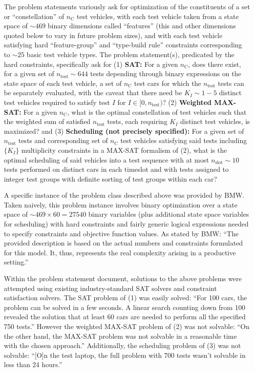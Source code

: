 \documentclass[aps,prl,twocolumn,superscriptaddress,groupedaddress]{revtex4}  %
\begin{document}
The problem statements variously ask for optimization of the constituents of a
set or
``constellation'' of $n_{\mathrm{C}}$ test vehicles, with each test vehicle taken
from a state space of $\sim 469$ binary dimensions called ``features'' (this and other dimensions
quoted below to vary
in future problem sizes), and with each test vehicle 
satisfying hard ``feature-group'' and ``type-build rule'' constraints
corresponding to $\sim 25$ basic test vehicle types. The problem
statement(s), predicated by the hard constraints, specifically ask for
(1) \textbf{SAT:} 
For a given $n_{\mathrm{C}}$, does there exist, for a given set of
$n_{\mathrm{test}} \sim 644$ tests depending through binary expressions on the state
space of each test vehicle, a set of $n_{\mathrm{C}}$ test cars for which the
$n_{\mathrm{test}}$ tests can be separately evaluated, with the caveat 
that there need be $K_I \sim 1-5$ distinct
test vehicles required to satisfy test $I$ for $I \in [0, n_{\mathrm{test}})$?
(2) \textbf{Weighted MAX-SAT:} For a given $n_{\mathrm{C}}$, what is the optimal
constellation of test vehicles such that the weighted sum of satisfied $n_{\mathrm{test}}$
tests, each requiring $K_I$ distinct test vehicles, is maximized? and 
(3) \textbf{Scheduling (not precisely specified):} For a given set of
$n_{\mathrm{test}}$ tests and corresponding set of $n_{\mathrm{C}}$ test
vehicles satisfying said tests including $\{ K_I \}$ multiplicity constraints in
a MAX-SAT formalism of (2), what is the optimal scheduling of said vehicles into 
a test sequence with at most $n_{\mathrm{slot}} \sim 10$ tests performed on
distinct cars in each timeslot and with tests assigned to integer test groups
with definite sorting of test groups within each car?

A specific instance of the problem class described above was provided by BMW.
Taken naively, this problem instance involves binary optimization over a state
space of $\sim 469\times60 = 27540$ binary variables (plus additional state
space variables for scheduling) with hard constraints and fairly generic logical
expressions needed to specify constraints and objective function values.  As
stated by BMW: ``The provided description is based on the actual numbers and
constraints formulated for this model. It, thus, represents the real complexity
arising in a productive setting.''

Within the problem statement document, solutions to the above problems were
attempted using existing industry-standard SAT solvers and constraint
satisfaction solvers. The SAT problem of (1) was easily solved:
``For 100 cars, the problem can be solved in a few seconds. A linear search counting down
from 100 revealed the solution that at least 60 cars are needed to perform all the specified
750 tests.''
However the weighted MAX-SAT problem of (2) was not solvable:
``On the other hand, the MAX-SAT problem was not solvable in a reasonable time with the
chosen approach.''
Additionally, the scheduling problem of (3) was not solvable:
``[O]n the test laptop, the full problem with 700 tests wasn't solvable in less than 24
hours.''
\end{document}

